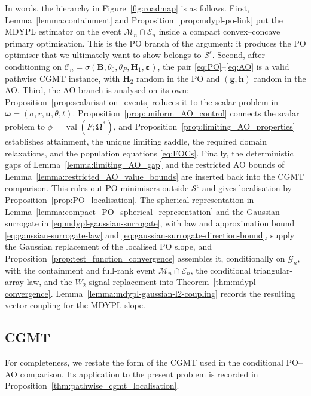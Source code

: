 \documentclass{article}
\theoremstyle{definition}
\newcommand*{\bb}{\boldsymbol}
\def\bH {\bb{H}}
\def\bu{\bb{u}}
\def\bh{\bb{h}}
\def\bg{\bb{g}}
\def\bH{\bb{H}}
\begin{document}
\begin{bibunit}
In words, the hierarchy in Figure~\ref{fig:roadmap} is as follows. First,
Lemma~\ref{lemma:containment} and Proposition~\ref{prop:mdypl-po-link} put the
MDYPL estimator on the event $\mathcal M_n\cap\mathcal E_n$ inside a compact convex--concave
primary optimisation. This is the PO branch of the argument: it produces the
PO optimiser that we ultimately want to show belongs to
$\mathcal S^\epsilon$. Second, after conditioning on
$\mathcal C_n=\sigma(\bb B,\theta_0,\theta_P,\bH_1,\bb\varepsilon)$, the pair
\eqref{eq:PO}--\eqref{eq:AO} is a valid pathwise CGMT instance, with $\bH_2$
random in the PO and $(\bg,\bh)$ random in the AO. Third, the AO branch is
analysed on its own: Proposition~\ref{prop:scalarisation_events} reduces it to
the scalar problem in $\bb\omega=(\sigma,r,\bu,\theta,t)$.
Proposition~\ref{prop:uniform_AO_control} connects the scalar problem to
$\bar\phi=\operatorname{val}(F;\bb\Omega^*)$, and
Proposition~\ref{prop:limiting_AO_properties} establishes attainment, the
unique limiting saddle, the required domain relaxations, and the population
equations \eqref{eq:FOCs}. Finally, the deterministic gaps of
Lemma~\ref{lemma:limiting_AO_gap} and the restricted AO bounds of
Lemma~\ref{lemma:restricted_AO_value_bounds} are inserted back into the CGMT
comparison. This rules out PO minimisers outside
$\mathcal S^\epsilon$ and gives localisation by
Proposition~\ref{prop:PO_localisation}. The spherical representation in
Lemma~\ref{lemma:compact_PO_spherical_representation} and the Gaussian
surrogate in \eqref{eq:mdypl-gaussian-surrogate}, with law and approximation
bound \eqref{eq:gaussian-surrogate-law} and
\eqref{eq:gaussian-surrogate-direction-bound}, supply the Gaussian
replacement of the localised PO slope, and
Proposition~\ref{prop:test_function_convergence} assembles it,
conditionally on $\mathcal G_n$, with the containment and full-rank event
$\mathcal M_n\cap\mathcal E_n$, the conditional triangular-array law, and
the $W_2$ signal replacement into Theorem~\ref{thm:mdypl-convergence}.
Lemma~\ref{lemma:mdypl-gaussian-l2-coupling} records the resulting vector
coupling for the MDYPL slope.

\subsection{CGMT} \label{sec:CGMT}

For completeness, we restate the form of the CGMT used in the conditional
PO--AO comparison. Its application to the present problem is recorded in
Proposition~\ref{thm:pathwise_cgmt_localisation}.


\end{bibunit}
\end{document}
